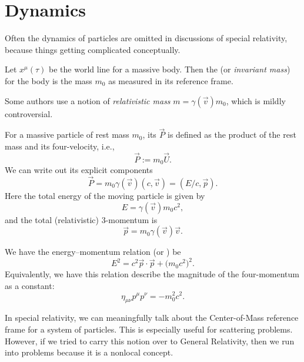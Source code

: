 \section{Dynamics}

\M
Often the dynamics of particles are omitted in discussions of special
relativity, because things getting complicated conceptually.

\begin{definition}
Let $x^{\mu}(\tau)$ be the world line for a massive body.
Then the  (or \emph{invariant mass}) for the body is
the mass $m_{0}$ as measured in its reference frame.
\end{definition}

\begin{remark}
Some authors use a notion of \emph{relativistic mass}
$m = \gamma(\vec{v})m_{0}$, which is mildly controversial. 
\end{remark}

For a massive particle of rest mass $m_{0}$, its 
$\vec{P}$ is defined as the product of the rest mass and its
four-velocity, i.e.,
\begin{equation}
\vec{P} := m_{0}\vec{U}.
\end{equation}
We can write out its explicit components
\begin{equation}
\vec{P} = m_{0}\gamma(\vec{v})(c, \vec{v}) = (E/c, \vec{p}).
\end{equation}
Here the total energy of the moving particle is given by
\begin{equation}
E = \gamma(\vec{v})m_{0}c^{2},
\end{equation}
and the total (relativistic) 3-momentum is
\begin{equation}
\vec{p} = m_{0}\gamma(\vec{v})\vec{v}.
\end{equation}

We have the energy--momentum relation (or )
be
\begin{equation}
E^{2} = c^{2}\vec{p}\cdot\vec{p} + \bigl(m_{0}c^{2}\bigr)^{2}.
\end{equation}
Equivalently, we have this relation describe the magnitude of the
four-momentum as a constant:
\begin{equation}
\eta_{\mu\nu}p^{\mu}p^{\nu} = -m_{0}^{2}c^{2}.
\end{equation}

\begin{ddanger}
In special relativity, we can meaningfully talk about the Center-of-Mass
reference frame for a system of particles. This is especially useful for
scattering problems. However, if we tried to carry this notion over to
General Relativity, then we run into problems because it is a nonlocal
concept. 
\end{ddanger}


